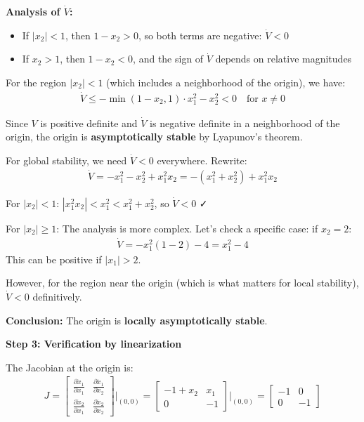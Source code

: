 \documentclass[11pt,a4paper]{article}
\begin{document}
\textbf{Analysis of $\dot{V}$:}
\begin{itemize}
\item If $|x_2| < 1$, then $1 - x_2 > 0$, so both terms are negative: $\dot{V} < 0$
\item If $x_2 > 1$, then $1 - x_2 < 0$, and the sign of $\dot{V}$ depends on relative magnitudes
\end{itemize}

For the region $|x_2| < 1$ (which includes a neighborhood of the origin), we have:
\begin{align}
\dot{V} \leq -\min(1 - x_2, 1) \cdot x_1^2 - x_2^2 < 0 \quad \text{for } x \neq 0
\end{align}

Since $V$ is positive definite and $\dot{V}$ is negative definite in a neighborhood of the origin, the origin is \textbf{asymptotically stable} by Lyapunov's theorem.

For global stability, we need $\dot{V} < 0$ everywhere. Rewrite:
\begin{align}
\dot{V} = -x_1^2 - x_2^2 + x_1^2 x_2 = -(x_1^2 + x_2^2) + x_1^2 x_2
\end{align}

For $|x_2| < 1$: $|x_1^2 x_2| < x_1^2 < x_1^2 + x_2^2$, so $\dot{V} < 0$ ✓

For $|x_2| \geq 1$: The analysis is more complex. Let's check a specific case: if $x_2 = 2$:
\begin{align}
\dot{V} = -x_1^2(1-2) - 4 = x_1^2 - 4
\end{align}
This can be positive if $|x_1| > 2$.

However, for the region near the origin (which is what matters for local stability), $\dot{V} < 0$ definitively.

\textbf{Conclusion:} The origin is \textbf{locally asymptotically stable}.

\textbf{Step 3: Verification by linearization}

The Jacobian at the origin is:
\begin{align}
J = \begin{bmatrix} \frac{\partial \dot{x}_1}{\partial x_1} & \frac{\partial \dot{x}_1}{\partial x_2} \\ \frac{\partial \dot{x}_2}{\partial x_1} & \frac{\partial \dot{x}_2}{\partial x_2} \end{bmatrix}\bigg|_{(0,0)} = \begin{bmatrix} -1 + x_2 & x_1 \\ 0 & -1 \end{bmatrix}\bigg|_{(0,0)} = \begin{bmatrix} -1 & 0 \\ 0 & -1 \end{bmatrix}
\end{align}
\end{document}
